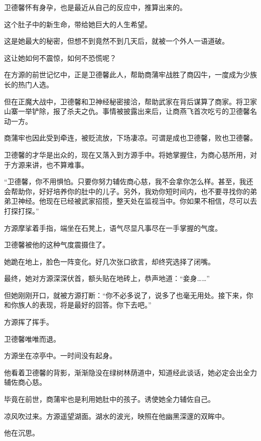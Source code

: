 
\begin{this_body}



卫德馨怀有身孕，也是最近从自己的反应中，推算出来的。

这个肚子中的新生命，带给她巨大的人生希望。

这是她最大的秘密，但想不到竟然不到几天后，就被一个外人一语道破。

这让她如何不震惊，如何不恐慌呢？

在方源的前世记忆中，正是卫德馨此人，帮助商蒲牢战胜了商囚牛，一度成为少族长的热门人选。

但在正魔大战中，卫德馨和卫神经秘密接洽，帮助武家在背后谋算了商家。将卫家山寨一举铲除，报了杀夫之仇。事情被披露出来后，让商燕飞首次吃亏的卫德馨名动一方。

商蒲牢也因此受到牵连，被贬流放，下场凄凉。可谓是成也卫德馨，败也卫德馨。

卫德馨的才华是出众的，现在又落入到方源手中。将她掌握住，为商心慈所用，对于方源来讲，也不算难事。

“卫德馨，你不用惧怕。只要你努力辅佐商心慈，我不会拿你怎么样。甚至，我还会帮助你，好好培养你的肚中的儿子。另外，我劝你短时间内，也不要寻找你的弟弟卫神经。他现在已经被武家招揽，整天处在监视当中。你如果不相信，尽可以去打探打探。”

方源摩挲着手指，端坐在石凳上，语气尽显凡事尽在一手掌握的气度。

卫德馨被他的这种气度震摄住了。

她跪在地上，脸色一阵变化。好几次张口欲言，却终究选择了闭嘴。

最终，她对方源深深伏首，额头贴在地砖上，恭声地道：“妾身……”

但她刚刚开口，就被方源打断：“你不必多说了，说多了也毫无用处。接下来，你和你族人的表现，将是最好的回答。你下去吧。”

方源挥了挥手。

卫德馨唯唯而退。

方源坐在凉亭中。一时间没有起身。

他看着卫德馨的背影，渐渐隐没在绿树林荫道中，知道经此谈话，她必定会出全力辅佐商心慈。

毕竟在前世，商蒲牢也是利用她肚中的孩子。诱使她全力辅佐自己。

凉风吹过来。方源遥望湖面。湖水的波光，映照在他幽黑深邃的双眸中。

他在沉思。


\end{this_body}
